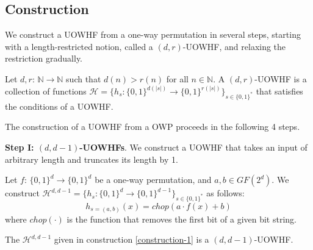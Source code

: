 \documentclass[12pt]{tufte-book}
\newcommand{\bit}{\{0,1\}}
\begin{document}
\subsection{Construction}
We construct a UOWHF from a one-way permutation in several steps, starting with a length-restricted notion, called a $(d,r)$-UOWHF, and relaxing the restriction gradually. 

\begin{definition}[$(d,r)$-UOWHFs]
Let $d,r$: $\mathbb{N}\rightarrow\mathbb{N}$ such that $d(n) > r(n)$ for all $n \in \mathbb{N}$. A $(d,r)$-UOWHF is a collection of functions $\mathcal{H} = \{h_s: \bit^{d(|s|)}\rightarrow\bit^{r(|s|)}\}_{s\in\bit^{*}}$ that satisfies the conditions of a UOWHF.
\end{definition}

The construction of a UOWHF from a OWP proceeds in the following 4 steps.

\noindent\textbf{Step I: $(d, d-1)$-UOWHFs}.
We construct a UOWHF that takes an input of arbitrary length and truncates its length by 1. 
\begin{construction}\label{construction-1}
    Let $f$: $\bit^{d}\rightarrow\bit^{d}$ be a one-way permutation, and $a,b\in GF(2^d)$. We construct $\mathcal{H}^{d, d-1} = \{h_s: \bit^{d}\rightarrow\bit^{d-1}\}_{s \in \bit^*}$ as follows: 
    \[
        h_{s=(a,b)}(x)=chop(a\cdot f(x)+b)
    \]
    where $chop(\cdot)$ is the function that removes the first bit of a given bit string. 
\end{construction}

\begin{claim}
    The $\mathcal{H}^{d, d-1}$ given in construction \ref{construction-1} is a $(d,d-1)$-UOWHF.
\end{claim} 
\end{document}
